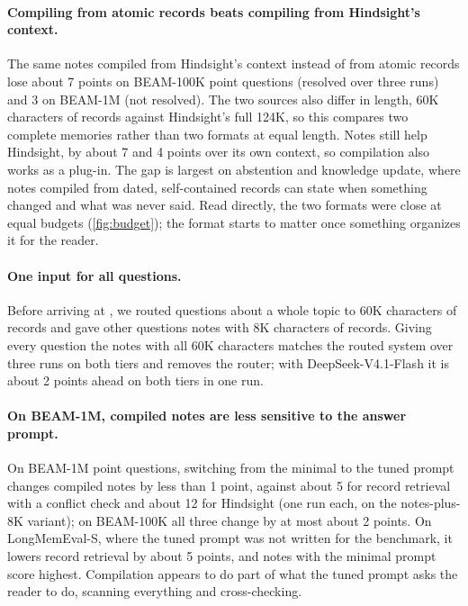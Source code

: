 \paragraph{Compiling from atomic records beats compiling from Hindsight's context.}
The same notes compiled from Hindsight's context instead of from atomic records lose about 7 points on BEAM-100K point
questions (resolved over three runs) and 3 on BEAM-1M (not resolved). The two sources also differ in length, 60K
characters of records against Hindsight's full 124K, so this compares two complete memories rather than two formats at
equal length. Notes still help Hindsight, by about 7 and 4 points over its own context, so compilation also works as a
plug-in. The gap is largest on abstention and knowledge update, where notes compiled from dated, self-contained records
can state when something changed and what was never said. Read directly, the two formats were close at equal budgets
(\cref{fig:budget}); the format starts to matter once something organizes it for the reader.

\paragraph{One input for all questions.}
Before arriving at \method{}, we routed questions about a whole topic to 60K characters of records and gave other
questions notes with 8K characters of records. Giving every question the notes with all 60K characters matches the
routed system over three runs on both tiers and removes the router; with DeepSeek-V4.1-Flash it is about 2 points
ahead on both tiers in one run.

\paragraph{On BEAM-1M, compiled notes are less sensitive to the answer prompt.}
On BEAM-1M point questions, switching from the minimal to the tuned prompt changes compiled notes by less than 1 point,
against about 5 for record retrieval with a conflict check and about 12 for Hindsight (one run each, on the
notes-plus-8K variant); on BEAM-100K all three change by at most about 2 points. On LongMemEval-S, where the tuned prompt was
not written for the benchmark, it lowers record retrieval by about 5 points, and notes with the minimal prompt score
highest. Compilation appears to do part of what the tuned prompt asks the reader to do, scanning everything and
cross-checking. 

